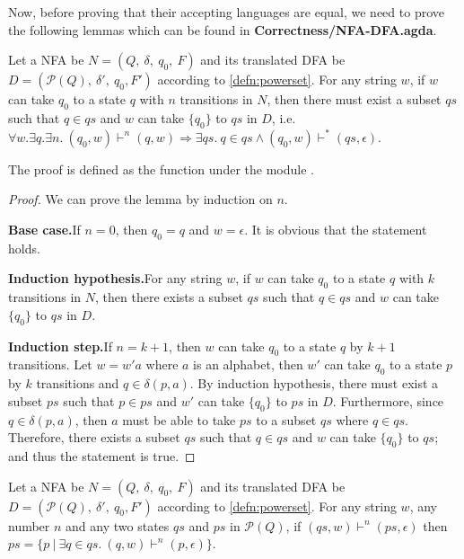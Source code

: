 \par Now, before proving that their accepting languages are equal, we 
need to prove the following lemmas which can be found in
\textbf{Correctness/NFA-DFA.agda}. 

\begin{lem}
\label{lem:nfa<dfa}
\noindent Let a NFA be \(N = (Q,\ \delta,\ q_0,\ F)\) and its
translated DFA be \(D = (\mathcal P \left({Q}\right),\ \delta',\ {q_0},
F')\) according to \autoref{defn:powerset}. For any string \(w\), if \(w\) can take \(q_0\) to a state
\(q\) with \(n\) transitions in \(N\), then there must exist a subset \(qs\) such that \(q
\in qs\) and \(w\) can take \(\{q_0\}\) to \(qs\) in \(D\),
i.e. \(\forall w.\exists q.\exists n.\ (q_0,w) \vdash^n (q,w) \Rightarrow
\exists qs.\ q \in qs \wedge ({q_0},w) \vdash^* (qs,\epsilon)\). 
\end{lem}

\par The proof is defined as the function  under the module
. 

\begin{proof}
\noindent We can prove the lemma by induction on \(n\).
\par \noindent \textbf{Base case.}\quad If \(n = 0\), then \(q_0 = q\)
and \(w = \epsilon\). It is obvious that the statement holds.

\par \noindent \textbf{Induction hypothesis.}\quad For any string \(w\), if \(w\) can take \(q_0\) to a state
\(q\) with \(k\) transitions in \(N\), then there exists a subset \(qs\) such that \(q
\in qs\) and \(w\) can take \(\{q_0\}\) to \(qs\) in \(D\). 

\par \noindent \textbf{Induction step.}\quad If \(n = k + 1\), then
\(w\) can take \(q_0\) to a state \(q\) by \(k + 1\) transitions. Let
\(w = w'a\) where \(a\) is an alphabet, then \(w'\) can take \(q_0\)
to a state \(p\) by \(k\) transitions and \(q \in \delta(p,a)\). By induction hypothesis, there must exist a subset \(ps\) such that \(p
\in ps\) and \(w'\) can take \(\{q_0\}\) to \(ps\) in \(D\). Furthermore, since \(q \in \delta(p,a)\), then \(a\) must be
able to take \(ps\) to a subset \(qs\) where \(q \in qs\). Therefore,
there exists a subset \(qs\) such that \(q \in qs\) and \(w\) can take
\(\{q_0\}\) to \(qs\); and thus the statement is true. 
\end{proof}

\begin{lem}
\label{lem:nfa>dfa}
\noindent Let a NFA be \(N = (Q,\ \delta,\ q_0,\ F)\) and its
translated DFA be \(D = (\mathcal P \left({Q}\right),\ \delta',\ {q_0},
F')\) according to \autoref{defn:powerset}. For any string \(w\), any
number \(n\) and any two states \(qs\) and \(ps\) in \(\mathcal P \left({Q}\right)\), if
\((qs,w) \vdash^n (ps,\epsilon)\) then \(ps =
\{p\ |\ \exists q\in qs.\ (q,w) \vdash^n (p,\epsilon)\}\). 
\end{lem}

